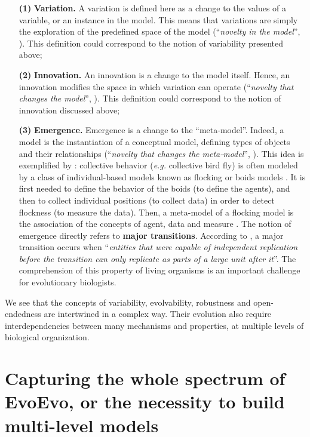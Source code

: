 \begin{enumerate}
\item[\textbf{(1)}] \textbf{Variation.} A variation is defined here as a change to the values of a variable, or an instance in the model. This means that variations are simply the exploration of the predefined space of the model (``\textit{novelty in the model}'', \citealt{banzhaf-et-al-2016}). This definition could correspond to the notion of variability presented above;
\item[\textbf{(2)}] \textbf{Innovation.} An innovation is a change to the model itself. Hence, an innovation modifies the space in which variation can operate (``\textit{novelty that changes the model}'', \citealt{banzhaf-et-al-2016}). This definition could correspond to the notion of innovation discussed above;
\item[\textbf{(3)}] \textbf{Emergence.} Emergence is a change to the ``meta-model''. Indeed, a model is the instantiation of a conceptual model, defining types of objects and their relationships (``\textit{novelty that changes the meta-model}'', \citealt{banzhaf-et-al-2016}). This idea is exemplified by \cite{andrews-et-al-2011}: collective behavior (\textit{e.g.} collective bird fly) is often modeled by a class of individual-based models known as flocking or boids models \citep{reynolds-1987}. It is first needed to define the behavior of the boids (to define the agents), and then to collect individual positions (to collect data) in order to detect flockness (to measure the data). Then, a meta-model of a flocking model is the association of the concepts of agent, data and measure \citep{andrews-et-al-2011}. The notion of emergence directly refers to \textbf{major transitions}. According to \cite{smith-szathmary-1997}, a major transition occurs when ``\textit{entities that were capable of independent replication before the transition can only replicate as parts of a large unit after it}''. The comprehension of this property of living organisms is an important challenge for evolutionary biologists.
\end{enumerate}

We see that the concepts of variability, evolvability, robustness and open-endedness are intertwined in a complex way. Their evolution also require interdependencies between many mechanisms and properties, at multiple levels of biological organization.

\section{Capturing the whole spectrum of EvoEvo, or the necessity to build multi-level models}
\label{sec:general_introduction:introduction:evoevo_is_multilevel}

